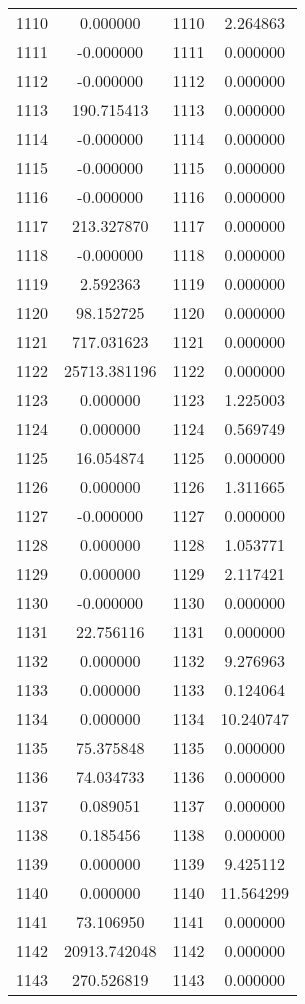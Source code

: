 \documentclass[12pt]{article}
\begin{document}
\begin{longtable}{@{}cccc@{}}
1110 & 0.000000 & 1110 & 2.264863 \\
1111 & -0.000000 & 1111 & 0.000000 \\
1112 & -0.000000 & 1112 & 0.000000 \\
1113 & 190.715413 & 1113 & 0.000000 \\
1114 & -0.000000 & 1114 & 0.000000 \\
1115 & -0.000000 & 1115 & 0.000000 \\
1116 & -0.000000 & 1116 & 0.000000 \\
1117 & 213.327870 & 1117 & 0.000000 \\
1118 & -0.000000 & 1118 & 0.000000 \\
1119 & 2.592363 & 1119 & 0.000000 \\
1120 & 98.152725 & 1120 & 0.000000 \\
1121 & 717.031623 & 1121 & 0.000000 \\
1122 & 25713.381196 & 1122 & 0.000000 \\
1123 & 0.000000 & 1123 & 1.225003 \\
1124 & 0.000000 & 1124 & 0.569749 \\
1125 & 16.054874 & 1125 & 0.000000 \\
1126 & 0.000000 & 1126 & 1.311665 \\
1127 & -0.000000 & 1127 & 0.000000 \\
1128 & 0.000000 & 1128 & 1.053771 \\
1129 & 0.000000 & 1129 & 2.117421 \\
1130 & -0.000000 & 1130 & 0.000000 \\
1131 & 22.756116 & 1131 & 0.000000 \\
1132 & 0.000000 & 1132 & 9.276963 \\
1133 & 0.000000 & 1133 & 0.124064 \\
1134 & 0.000000 & 1134 & 10.240747 \\
1135 & 75.375848 & 1135 & 0.000000 \\
1136 & 74.034733 & 1136 & 0.000000 \\
1137 & 0.089051 & 1137 & 0.000000 \\
1138 & 0.185456 & 1138 & 0.000000 \\
1139 & 0.000000 & 1139 & 9.425112 \\
1140 & 0.000000 & 1140 & 11.564299 \\
1141 & 73.106950 & 1141 & 0.000000 \\
1142 & 20913.742048 & 1142 & 0.000000 \\
1143 & 270.526819 & 1143 & 0.000000 \\

\end{longtable}
\end{document}
